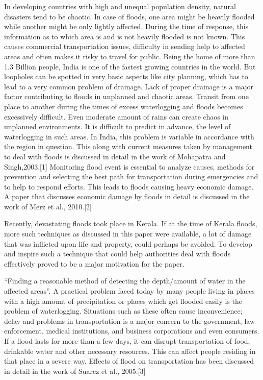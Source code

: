 \documentclass[conference]{IEEEtran}
\begin{document}
In developing countries with high and unequal population density, natural disasters tend to be chaotic. In case of floods, one area might be heavily flooded while another might be only lightly affected. During the time of response, this information as to which area is and is not heavily flooded is not known. This causes commercial transportation issues, difficulty in sending help to affected areas and often makes it risky to travel for public. Being the home of more than 1.3 Billion people, India is one of the fastest growing countries in the world. But loopholes can be spotted in very basic aspects like city planning, which has to lead to a very common problem of drainage. Lack of proper drainage is a major factor contributing to floods in unplanned and chaotic areas. Transit from one place to another during the times of excess waterlogging and floods becomes excessively difficult. Even moderate amount of rains can create chaos in unplanned environments. It is difficult to predict in advance, the level of waterlogging in such areas. In India, this problem is variable in accordance with the region in question. This along with current measures taken by management to deal with floods is discussed in detail in the work of Mohapatra and Singh,2003.[1] Monitoring flood event is essential to analyze causes, methods for prevention and selecting the best path for transportation during emergencies and to help to respond efforts. This leads to floods causing heavy economic damage. A paper that discusses economic damage by floods in detail is discussed in the work of  Merz et al., 2010.[2] 

Recently, devastating floods took place in Kerala. If at the time of Kerala floods, more such techniques as discussed in this paper were available, a lot of damage that was inflicted upon life and property, could perhaps be avoided. To develop and inspire such a technique that could help authorities deal with floods effectively proved to be a major motivation for the paper. 

“Finding a reasonable method of detecting the depth/amount of water in the affected areas”.
A practical problem faced today by many people living in places with a high amount of precipitation or places which get flooded easily is the problem of waterlogging. Situations such as these often cause inconvenience; delay and problems in  transportation is a major concern to the government, law enforcement, medical institutions, and business corporations and even consumers. If a flood lasts for more than a few days, it can disrupt transportation of food, drinkable water and other necessary resources. This can affect people residing in that place in a severe way. Effects of flood on transportation has been discussed in detail in the work of Suarez et al., 2005.[3] 
\end{document}
